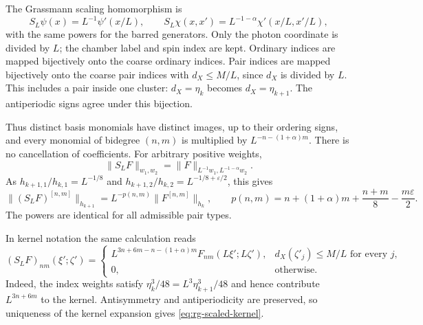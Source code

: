The Grassmann scaling homomorphism is
\begin{equation}\label{eq:rg-leg-scaling}
 S_L\psi(x)=L^{-1}\psi'(x/L),\qquad
 S_L\chi(x,x')=L^{-1-\alpha}\chi'(x/L,x'/L),
\end{equation}
with the same powers for the barred generators.
Only the photon coordinate is divided by $L$; the chamber
label and spin index are kept. Ordinary indices are mapped
bijectively onto the coarse ordinary indices. Pair indices
are mapped bijectively onto the coarse pair indices with
$d_X\le M/L$, since $d_X$ is divided by $L$.
This includes a pair inside one cluster:
$d_X=\eta_k$ becomes $d_X=\eta_{k+1}$.
The antiperiodic signs agree under this bijection.

Thus distinct basis monomials have distinct images, up to
their ordering signs, and every monomial of bidegree $(n,m)$
is multiplied by $L^{-n-(1+\alpha)m}$. There is no cancellation
of coefficients. For arbitrary positive weights,
\begin{equation}\label{eq:rg-scaling-norm-identity}
 \|S_LF\|_{w_1,w_2}=\|F\|_{L^{-1}w_1,L^{-1-\alpha}w_2}.
\end{equation}
As $h_{k+1,1}/h_{k,1}=L^{-1/8}$ and
$h_{k+1,2}/h_{k,2}=L^{-1/8+\varepsilon/2}$, this gives
\begin{equation}\label{eq:rg-degree-scaling}
 \|(S_LF)^{[n,m]}\|_{h_{k+1}}
       =L^{-p(n,m)}\|F^{[n,m]}\|_{h_k},\qquad
 p(n,m)=n+(1+\alpha)m+\frac{n+m}{8}-\frac{m\varepsilon}{2}.
\end{equation}
The powers are identical for all admissible pair types.

In kernel notation the same calculation reads
\begin{equation}\label{eq:rg-scaled-kernel}
 (S_LF)_{nm}(\xi';\zeta')=
 \begin{cases}
 L^{3n+6m-n-(1+\alpha)m}F_{nm}(L\xi';L\zeta'),
                       &d_X(\zeta'_j)\le M/L\text{ for every }j,\\
 0,                    &\text{otherwise}.
 \end{cases}
\end{equation}
Indeed, the index weights satisfy
$\eta_k^3/48=L^3\eta_{k+1}^3/48$ and hence contribute
$L^{3n+6m}$ to the kernel. Antisymmetry and antiperiodicity
are preserved, so uniqueness of the kernel expansion gives
\eqref{eq:rg-scaled-kernel}.

